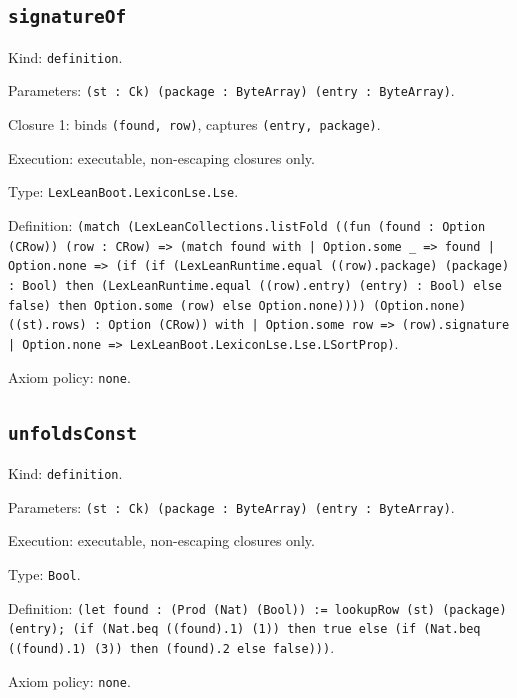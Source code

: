 \documentclass[11pt]{article}
\begin{document}
\subsection*{\texttt{signatureOf}}
\noindent Kind: \texttt{definition}.\par
\noindent Parameters: \texttt{(st : Ck) (package : ByteArray) (entry : ByteArray)}.\par
\noindent Closure 1: binds \texttt{(found, row)}, captures \texttt{(entry, package)}.\par
\noindent Execution: executable, non-escaping closures only.\par
\noindent Type: \texttt{LexLeanBoot.LexiconLse.Lse}.\par
\noindent Definition: \texttt{(match (LexLeanCollections.listFold ((fun (found : Option (CRow)) (row : CRow) => (match found with | Option.some \_ => found | Option.none => (if (if (LexLeanRuntime.equal ((row).package) (package) : Bool) then (LexLeanRuntime.equal ((row).entry) (entry) : Bool) else false) then Option.some (row) else Option.none)))) (Option.none) ((st).rows) : Option (CRow)) with | Option.some row => (row).signature | Option.none => LexLeanBoot.LexiconLse.Lse.LSortProp)}.\par
\noindent Axiom policy: \texttt{none}.\par
\subsection*{\texttt{unfoldsConst}}
\noindent Kind: \texttt{definition}.\par
\noindent Parameters: \texttt{(st : Ck) (package : ByteArray) (entry : ByteArray)}.\par
\noindent Execution: executable, non-escaping closures only.\par
\noindent Type: \texttt{Bool}.\par
\noindent Definition: \texttt{(let found : (Prod (Nat) (Bool)) := lookupRow (st) (package) (entry); (if (Nat.beq ((found).1) (1)) then true else (if (Nat.beq ((found).1) (3)) then (found).2 else false)))}.\par
\noindent Axiom policy: \texttt{none}.\par
\end{document}

